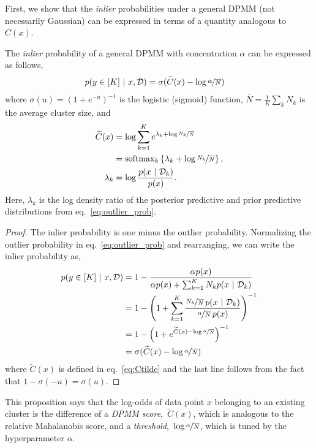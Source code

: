 First, we show that the \emph{inlier} probabilities under a general DPMM (not necessarily Gaussian) can be expressed in terms of a quantity analogous to $C(x)$.
\begin{proposition}
\label{prop:rmds_dpmm}
The \emph{inlier} probability of a general DPMM with concentration $\alpha$ can be expressed as follows,
\begin{align}
    p(y \in [K] ~\vert~ x, \mathcal{D})
    &= \sigma(\widetilde{C}(x) - \log \nicefrac{\alpha}{\overline{N}})
\end{align}
where $\sigma(u) = (1 + e^{-u})^{-1}$ is the logistic (sigmoid) function, ${\overline{N}=\tfrac{1}{K} \sum_k N_k}$ is the average cluster size,
and
\begin{align}
    \nonumber \widetilde{C}(x) &= \log \sum_{k=1}^K e^{\lambda_k + \log \nicefrac{N_k}{\overline{N}}} \\
    \label{eq:Ctilde}
    &= \mathrm{softmax}_k \left\{ \lambda_k + \log \nicefrac{N_k}{\overline{N}} \right\}, \\
    \lambda_k &= \log \frac{p(x ~\vert~ \mathcal{D}_k)}{p(x)}.
\end{align}
Here, $\lambda_k$ is the log density ratio of the posterior predictive and prior predictive distributions from eq.~\eqref{eq:outlier_prob}.
\end{proposition}

\begin{proof}
The inlier probability is one minus the outlier probability.
Normalizing the outlier probability in eq.~\eqref{eq:outlier_prob} and rearranging, we can write the inlier probability as,
\begin{align}
    \nonumber p(y \in [K] ~\vert~ x, \mathcal{D}) &=
    1 - \frac{\alpha p(x)}{\alpha p(x) + \sum_{k=1}^K N_k p(x ~\vert~ \mathcal{D}_k)} \\
    \nonumber &=
    1 - \left( 1 +  \sum_{k=1}^K \frac{\nicefrac{N_k}{\overline{N}} \, p(x ~\vert~ \mathcal{D}_k)}{\nicefrac{\alpha}{\overline{N}} \, p(x)} \right)^{-1} \\
    \nonumber &= 1 - \left(1 + e^{\widetilde{C}(x) - \log \nicefrac{\alpha}{\overline{N}}}\right)^{-1} \\
    &= \sigma(\widetilde{C}(x) - \log \nicefrac{\alpha}{\overline{N}})
\end{align}
where $\widetilde{C}(x)$ is defined in eq.~\eqref{eq:Ctilde} and the last line follows from the fact that $1 - \sigma(-u) = \sigma(u)$.
\end{proof}

This proposition says that the log-odds of data point $x$ belonging to an existing cluster is the difference of a \textit{DPMM score},~$\widetilde{C}(x)$, which is analogous to the relative Mahalanobis score, and a \textit{threshold},~$\log \nicefrac{\alpha}{\overline{N}}$, which is tuned by the hyperparameter $\alpha$.

